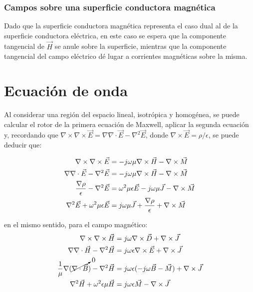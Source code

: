 
\subsubsection{Campos sobre una superficie conductora magnética}
Dado que la superficie conductora magnética representa el caso dual al de la superficie conductora eléctrica, en este caso se espera que la componente tangencial de $\vec{H}$ se anule sobre la superficie, mientras que la componente tangencial del campo eléctrico dé lugar a corrientes magnéticas sobre la misma.


\section{Ecuación de onda}
\label{subsec_eq_de_onda}

Al considerar una región del espacio lineal, isotrópica y homogénea, se puede calcular el rotor de la primera ecuación de Maxwell, aplicar la segunda ecuación y, recordando que $\nabla \times \nabla \times \vec{E} = \nabla \nabla \cdot \vec{E} - \nabla^2\vec{E}$, donde $\nabla \times \vec{E} = \rho/\epsilon$, se puede deducir que:

\begin{align}
	\nabla \times \nabla \times \vec{E} & = -j \omega \mu \nabla \times \vec{H} - \nabla \times \vec{M} \notag \\
	\nabla \nabla \cdot \vec{E} - \nabla^2 \vec{E} & = -j \omega \mu \nabla \times \vec{H} - \nabla \times \vec{M} \notag \\
	\frac{\nabla \rho}{\epsilon} - \nabla^2 \vec{E} & = \omega^2 \mu \epsilon \vec{E} - j \omega \mu \vec{J} - \nabla \times \vec{M} \notag\\
	\nabla^2 \vec{E} + \omega^2 \mu \epsilon \vec{E} & = j \omega \mu \vec{J} + \frac{\nabla \rho}{\epsilon} + \nabla \times \vec{M}
	\label{eq:eq_ondas_completa_E}
\end{align}

en el mismo sentido, para el campo magnético:
\begin{align}
	\nabla \times \nabla \times \vec{H} & = j \omega \nabla \times \vec{D} +  \nabla \times \vec{J} \notag \\
	\nabla \nabla \cdot \vec{H} - \nabla^2 \vec{H} & = j \omega \epsilon \nabla \times \vec{E} + \nabla \times \vec{J} \notag \\
	\frac{1}{\mu} \nabla (\cancelto{0}{\nabla \cdot \vec{B}}) - \nabla^2 \vec{H} & = j \omega \epsilon (-j \omega \vec{B} - \vec{M}) + \nabla \times \vec{J} \notag \\
	\nabla^2 \vec{H} + \omega^2 \epsilon \mu \vec{H} & =  j \omega \epsilon \vec{M} - \nabla \times \vec{J}
	\label{eq:eq_ondas_completa_H}
\end{align}

